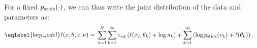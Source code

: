 For a fixed $p_{\mathrm{stick}}(\cdot)$, we can thus write the joint distribution of
the data and parameters as:
%
\begin{align}\eqlabel{bnp_model}
%
\logp(\x, \theta, \z, \nu) ={}&
    \sum_{n=1}^N \sum_{k=1}^{\infty}
        \z_{\n\k} \left(
            \logp(\x_n \vert \theta_\k) + \log \pi_\k
        \right) +
    \sum_{k=1}^{\infty} \left(
        \log \pstick(\nu_\k) + \logp(\theta_\k)
    \right).
%
\end{align}
%
